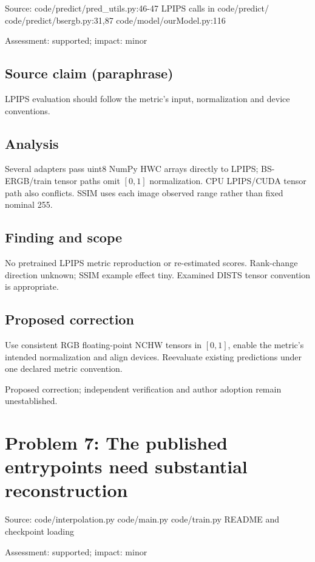 \documentclass[11pt]{article}
\begin{document}
Source: code/predict/pred\_utils.py:46-47 LPIPS calls in code/predict/ code/predict/bsergb.py:31,87 code/model/ourModel.py:116

Assessment: supported; impact: minor

\subsection*{Source claim (paraphrase)}

LPIPS evaluation should follow the metric's input, normalization and device conventions.

\subsection*{Analysis}

Several adapters pass uint8 NumPy HWC arrays directly to LPIPS; BS-ERGB/train tensor paths omit \([0,1]\) normalization. CPU LPIPS/CUDA tensor path also conflicts. SSIM uses each image observed range rather than fixed nominal 255.

\subsection*{Finding and scope}

No pretrained LPIPS metric reproduction or re-estimated scores. Rank-change direction unknown; SSIM example effect tiny. Examined DISTS tensor convention is appropriate.

\subsection*{Proposed correction}

Use consistent RGB floating-point NCHW tensors in \([0,1]\), enable the metric's intended normalization and align devices. Reevaluate existing predictions under one declared metric convention.

Proposed correction; independent verification and author adoption remain unestablished.

\section*{Problem 7: The published entrypoints need substantial reconstruction}

Source: code/interpolation.py code/main.py code/train.py README and checkpoint loading

Assessment: supported; impact: minor
\end{document}
